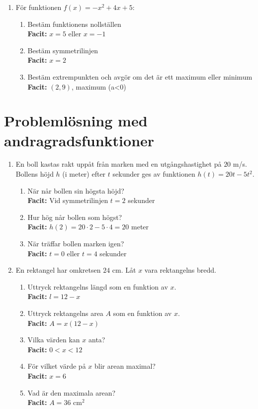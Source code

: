 \documentclass[a4paper,11pt]{article}
\begin{document}
\begin{enumerate}[label=\textbf{\arabic*.}]
    \item För funktionen $f(x) = -x^2 + 4x + 5$:
    \begin{enumerate}[label=\alph*)]
        \item Bestäm funktionens nollställen
        \\ \textbf{Facit:} $x=5$ eller $x=-1$
        \item Bestäm symmetrilinjen
        \\ \textbf{Facit:} $x=2$
        \item Bestäm extrempunkten och avgör om det är ett maximum eller minimum
        \\ \textbf{Facit:} $(2,9)$, maximum (a<0)
    \end{enumerate}
\end{enumerate}


\section{Problemlösning med andragradsfunktioner}

\begin{enumerate}[label=\textbf{\arabic*.}]
    \item En boll kastas rakt uppåt från marken med en utgångshastighet på $20$ m/s. Bollens höjd $h$ (i meter) efter $t$ sekunder ges av funktionen $h(t) = 20t - 5t^2$. 
    \begin{enumerate}[label=\alph*)]
        \item När når bollen sin högsta höjd?
        \\ \textbf{Facit:} Vid symmetrilinjen $t=2$ sekunder
        \item Hur hög når bollen som högst?
        \\ \textbf{Facit:} $h(2) = 20\cdot2 - 5\cdot4 = 20$ meter
        \item När träffar bollen marken igen?
        \\ \textbf{Facit:} $t=0$ eller $t=4$ sekunder
    \end{enumerate}
    
    \item En rektangel har omkretsen $24$ cm. Låt $x$ vara rektangelns bredd.
    \begin{enumerate}[label=\alph*)]
        \item Uttryck rektangelns längd som en funktion av $x$.
        \\ \textbf{Facit:} $l = 12-x$
        \item Uttryck rektangelns area $A$ som en funktion av $x$.
        \\ \textbf{Facit:} $A = x(12-x)$
        \item Vilka värden kan $x$ anta?
        \\ \textbf{Facit:} $0 < x < 12$
        \item För vilket värde på $x$ blir arean maximal?
        \\ \textbf{Facit:} $x=6$
        \item Vad är den maximala arean?
        \\ \textbf{Facit:} $A=36$ cm$^2$
    \end{enumerate}
\end{enumerate}
\end{document}

